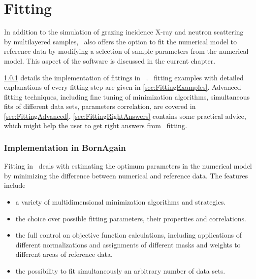 \section{Fitting} \label{sec:Fitting}

In addition to the simulation of grazing incidence
X-ray and neutron scattering by
multilayered samples, \BornAgain\ also offers the option to
fit the numerical model to reference data by modifying a selection of
sample parameters from the numerical model.  This aspect
of the software is discussed in the current chapter.

\cref{sec:FittingImplementation} details the
implementation of fittings in \BornAgain\ .
\Python\ fitting examples with detailed
explanations of every fitting step are given in \cref{sec:FittingExamples}. Advanced fitting techniques, including fine tuning of minimization
algorithms, simultaneous fits of different data sets, parameters
correlation, are covered in
\cref{sec:FittingAdvanced}. \cref{sec:FittingRightAnswers} contains some practical advice, which might
help the user to get right answers from \BornAgain\ fitting.


\subsubsection{Implementation in BornAgain} \label{sec:FittingImplementation}

Fitting in  \BornAgain\ deals with estimating the optimum parameters
in the numerical model by minimizing the difference between
numerical and reference data.
The features include

\begin{itemize}
\item a variety of multidimensional minimization algorithms and strategies.
\item the choice over possible fitting parameters, their properties and correlations.
\item the full control on objective function calculations, including applications of different normalizations and assignments of different masks and weights to different areas of reference data.
\item the possibility to fit simultaneously an arbitrary number of data sets.
\end{itemize}


